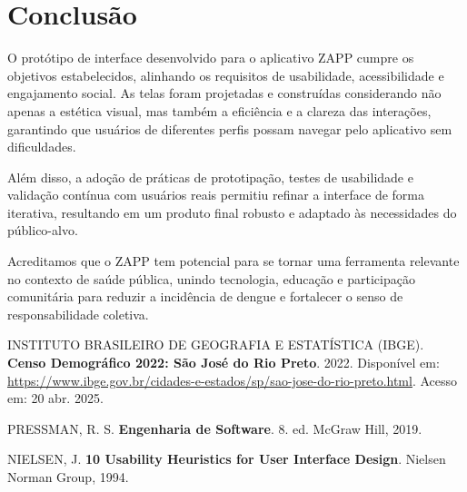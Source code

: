 \documentclass[a4paper, 12pt]{article}
\begin{document}
\newpage
\section{Conclusão}

O protótipo de interface desenvolvido para o aplicativo ZAPP cumpre os objetivos estabelecidos, alinhando os requisitos de usabilidade, acessibilidade e engajamento social. As telas foram projetadas e construídas considerando não apenas a estética visual, mas também a eficiência e a clareza das interações, garantindo que usuários de diferentes perfis possam navegar pelo aplicativo sem dificuldades.  

Além disso, a adoção de práticas de prototipação, testes de usabilidade e validação contínua com usuários reais permitiu refinar a interface de forma iterativa, resultando em um produto final robusto e adaptado às necessidades do público-alvo.  

Acreditamos que o ZAPP tem potencial para se tornar uma ferramenta relevante no contexto de saúde pública, unindo tecnologia, educação e participação comunitária para reduzir a incidência de dengue e fortalecer o senso de responsabilidade coletiva.


\begin{thebibliography}{09}
 INSTITUTO BRASILEIRO DE GEOGRAFIA E ESTATÍSTICA (IBGE). 
\textbf{Censo Demográfico 2022: São José do Rio Preto}. 
2022. 
Disponível em: \url{https://www.ibge.gov.br/cidades-e-estados/sp/sao-jose-do-rio-preto.html}. 
Acesso em: 20 abr. 2025.

 PRESSMAN, R. S. 
\textbf{Engenharia de Software}. 
8. ed. McGraw Hill, 2019.

 NIELSEN, J. 
\textbf{10 Usability Heuristics for User Interface Design}. 
Nielsen Norman Group, 1994.
\end{thebibliography}
\end{document}
